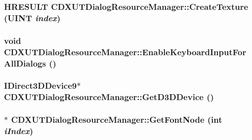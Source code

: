 \label{class_c_d_x_u_t_dialog_resource_manager_afd9720b2dfdd96e4a4434cefe4216af0}
\hypertarget{class_c_d_x_u_t_dialog_resource_manager_ae0bebe3ab6ef06f13e4abf84ac726458}{
\subsubsection[{CreateTexture}]{\setlength{\rightskip}{0pt plus 5cm}HRESULT CDXUTDialogResourceManager::CreateTexture (UINT {\em index})}}
\label{class_c_d_x_u_t_dialog_resource_manager_ae0bebe3ab6ef06f13e4abf84ac726458}
\hypertarget{class_c_d_x_u_t_dialog_resource_manager_a8733abc35a666eefd8a673eb587fb6e8}{
\subsubsection[{EnableKeyboardInputForAllDialogs}]{\setlength{\rightskip}{0pt plus 5cm}void CDXUTDialogResourceManager::EnableKeyboardInputForAllDialogs ()}}
\label{class_c_d_x_u_t_dialog_resource_manager_a8733abc35a666eefd8a673eb587fb6e8}
\hypertarget{class_c_d_x_u_t_dialog_resource_manager_a73c8686511bf3d782df524921915766b}{
\subsubsection[{GetD3DDevice}]{\setlength{\rightskip}{0pt plus 5cm}IDirect3DDevice9$\ast$ CDXUTDialogResourceManager::GetD3DDevice ()}}
\label{class_c_d_x_u_t_dialog_resource_manager_a73c8686511bf3d782df524921915766b}
\hypertarget{class_c_d_x_u_t_dialog_resource_manager_a06bc003b7adeab308924d576872d7808}{
\subsubsection[{GetFontNode}]{$\ast$ CDXUTDialogResourceManager::GetFontNode ({\bf int} {\em iIndex})}}
